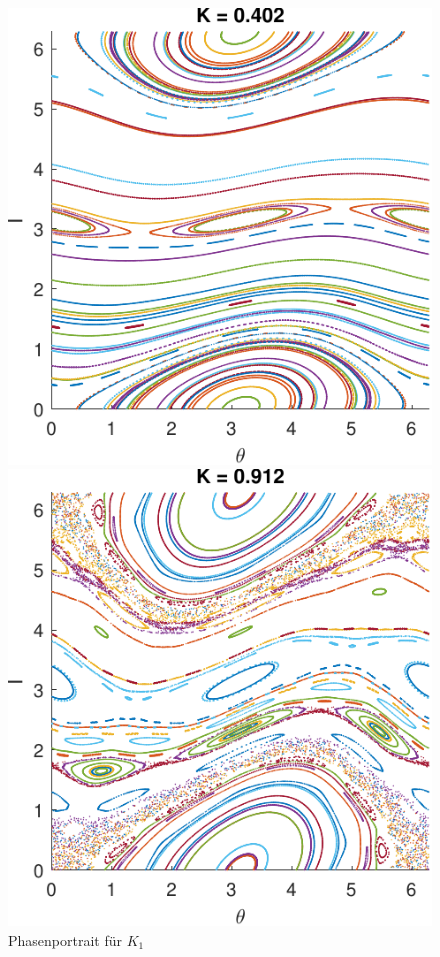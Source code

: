\documentclass[paper=a4, 
                DIV=12]{scrartcl}
\begin{document}
\begin{figure}[H]
    \centering
    \begin{minipage}[t]{0.48\textwidth}
        \centering
        \includegraphics[height=0.28\textheight]{figures/phasenportrait_k1.pdf}
        \caption{Phasenportrait für $K_1$}
    \end{minipage}
    \hfill
    \begin{minipage}[t]{0.48\textwidth}
        \centering
        \includegraphics[height=0.28\textheight]{figures/phasenportrait_k2.pdf}

\end{minipage}
\end{figure}
\end{document}
